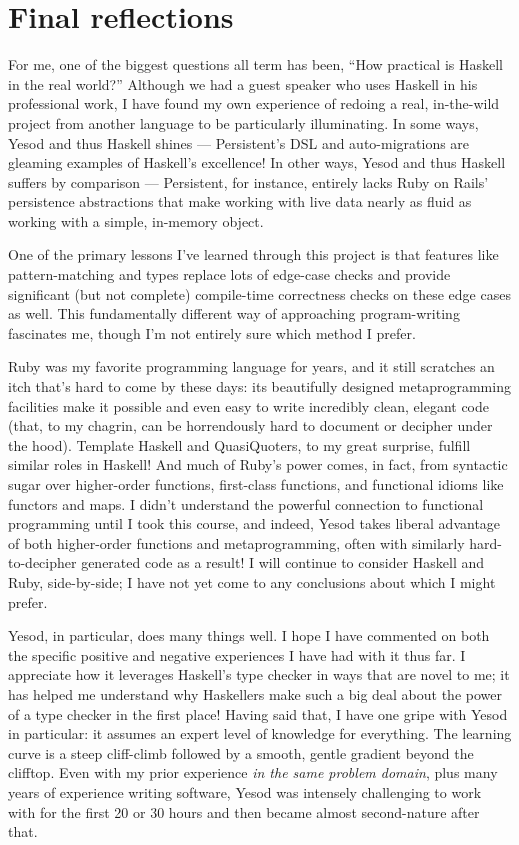 \section{Final reflections}

For me, one of the biggest questions all term has been, ``How practical is Haskell in the real world?'' Although we had a guest speaker who uses Haskell in his professional work, I have found my own experience of redoing a real, in-the-wild project from another language to be particularly illuminating. In some ways, Yesod and thus Haskell shines --- Persistent's DSL and auto-migrations are gleaming examples of Haskell's excellence! In other ways, Yesod and thus Haskell suffers by comparison --- Persistent, for instance, entirely lacks Ruby on Rails' persistence abstractions that make working with live data nearly as fluid as working with a simple, in-memory object.

One of the primary lessons I've learned through this project is that features like pattern-matching and  types replace lots of edge-case checks and provide significant (but not complete) compile-time correctness checks on these edge cases as well. This fundamentally different way of approaching program-writing fascinates me, though I'm not entirely sure which method I prefer.

Ruby was my favorite programming language for years, and it still scratches an itch that's hard to come by these days: its beautifully designed metaprogramming facilities make it possible and even easy to write incredibly clean, elegant code (that, to my chagrin, can be horrendously hard to document or decipher under the hood). Template Haskell and QuasiQuoters, to my great surprise, fulfill similar roles in Haskell! And much of Ruby's power comes, in fact, from syntactic sugar over higher-order functions, first-class functions, and functional idioms like functors and maps. I didn't understand the powerful connection to functional programming until I took this course, and indeed, Yesod takes liberal advantage of both higher-order functions and metaprogramming, often with similarly hard-to-decipher generated code as a result! I will continue to consider Haskell and Ruby, side-by-side; I have not yet come to any conclusions about which I might prefer.

Yesod, in particular, does many things well. I hope I have commented on both the specific positive and negative experiences I have had with it thus far. I appreciate how it leverages Haskell's type checker in ways that are novel to me; it has helped me understand why Haskellers make such a big deal about the power of a type checker in the first place! Having said that, I have one gripe with Yesod in particular: it assumes an expert level of knowledge for everything. The learning curve is a steep cliff-climb followed by a smooth, gentle gradient beyond the clifftop. Even with my prior experience \emph{in the same problem domain}, plus many years of experience writing software, Yesod was intensely challenging to work with for the first 20 or 30 hours and then became almost second-nature after that.

